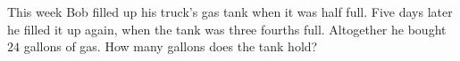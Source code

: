This week Bob filled up his truck's gas tank when it was half full. Five days later he filled it up again, when the tank was three fourths full. Altogether he bought $24$ gallons of gas. How many gallons does the tank hold?
